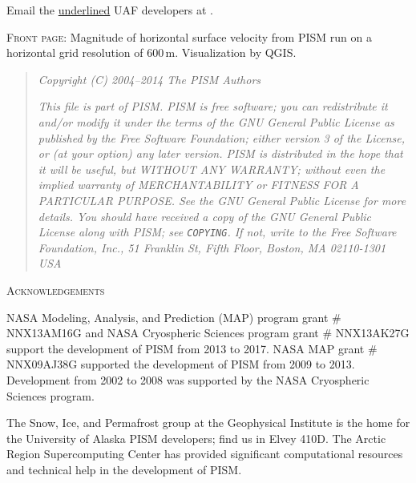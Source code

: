 \documentclass[titlepage,letterpaper,final]{scrartcl}
\begin{document}
\bigskip
\noindent Email the \underline{underlined} UAF developers at \qquad \PISMEMAIL.

\bigskip\bigskip
\noindent \textsc{Front page}:  Magnitude of horizontal surface velocity from PISM run on a horizontal grid resolution of 600\,m.  Visualization by QGIS.

\vfill

\newpage
\vspace{0.2in}
\begin{quote}
\textsl{Copyright (C) 2004--2014 The PISM Authors}
\medskip

\noindent \textsl{This file is part of PISM.  PISM is free software; you can redistribute it and/or modify it under the terms of the GNU General Public License as published by the Free Software Foundation; either version 3 of the License, or (at your option) any later version.  PISM is distributed in the hope that it will be useful, but WITHOUT ANY WARRANTY; without even the implied warranty of MERCHANTABILITY or FITNESS FOR A PARTICULAR PURPOSE.  See the GNU General Public License for more details.  You should have received a copy of the GNU General Public License along with PISM; see \emph{\texttt{COPYING}}.  If not, write to the Free Software Foundation, Inc., 51 Franklin St, Fifth Floor, Boston, MA  02110-1301 USA}
\end{quote}
\vspace{0.5in}

\centerline{\textsc{Acknowledgements}}
\bigskip

\small
NASA Modeling, Analysis, and Prediction (MAP) program grant \# NNX13AM16G and NASA Cryospheric Sciences program grant \# NNX13AK27G support the development of PISM from 2013 to 2017.  NASA MAP grant \# NNX09AJ38G supported the development of PISM from 2009 to 2013.  Development from 2002 to 2008 was supported by the NASA Cryospheric Sciences program.

The Snow, Ice, and Permafrost group at the Geophysical Institute is the home for the University of Alaska PISM developers; find us in Elvey 410D.  The Arctic Region Supercomputing Center has provided significant computational resources and technical help in the development of PISM.
\end{document}
